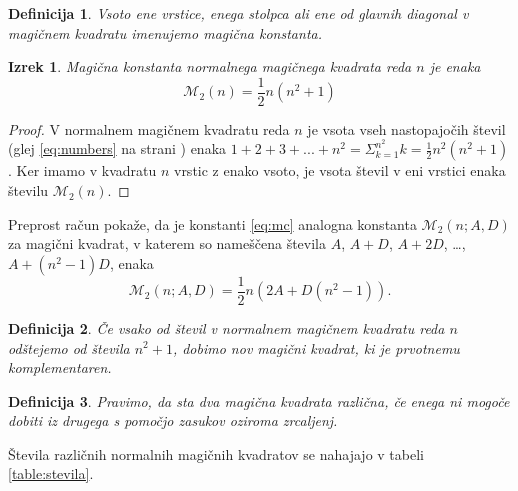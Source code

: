 \documentclass[a4paper,12pt]{article}
\newcommand{\m}{\mathcal{M}}
\newtheorem{izrek}{Izrek}
\newtheorem{definicija}{Definicija}
\begin{document}
\begin{definicija}
      Vsoto ene vrstice, enega stolpca ali ene od glavnih diagonal
      v magičnem kvadratu imenujemo \emph{magična konstanta}.
 \end{definicija}

 
 \begin{izrek}
     Magična konstanta normalnega magičnega kvadrata reda \(n\)
     je enaka
     \begin{equation}
      \label{eq:mc}
        \m_2(n)=\frac{1}{2}n(n^2+1)
     \end{equation}
 \end{izrek}


\begin{proof}
   
      V normalnem magičnem kvadratu reda \(n\) je vsota vseh nastopajočih
      števil (glej \eqref{eq:numbers} na strani \pageref{eq:numbers}) enaka
      \(1+2+3+...+n^2 = \varSigma_{k=1}^{n^2} k=\frac{1}{2}n^2(n^2+1) \). Ker imamo
      v kvadratu \(n\) vrstic z enako vsoto, je vsota števil v eni vrstici
      enaka številu \(\mathcal{M}_2(n)\). %
\end{proof}

Preprost račun pokaže, da je konstanti \eqref{eq:mc} analogna konstanta
\(\m_2(n;A,D)\) za magični kvadrat, v katerem so nameščena števila
\(A\), \(A+D\), \(A+2D\), \ldots, \(A+(n^2-1)D\), enaka %
\[\mathcal{M}_2(n;A,D)=\frac{1}{2}n(2A+D(n^2-1)).\] 

\begin{definicija}
      Če vsako od števil v normalnem magičnem kvadratu reda \(n\) odštejemo
      od števila \(n^2 + 1\), dobimo nov magični kvadrat, ki je prvotnemu
      \emph{komplementaren}.
 \end{definicija}

\begin{definicija}
      Pravimo, da sta dva magična kvadrata \emph{različna}, če enega ni mogoče dobiti
      iz drugega s pomočjo zasukov oziroma zrcaljenj.
 \end{definicija}

Števila različnih normalnih magičnih kvadratov se nahajajo v tabeli \ref{table:stevila}.
\end{document}
